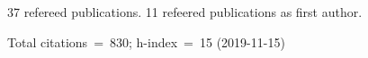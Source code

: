 37 refereed publications. 11 refeered publications as first author.

Total citations~=~830; h-index~=~15 (2019-11-15)
